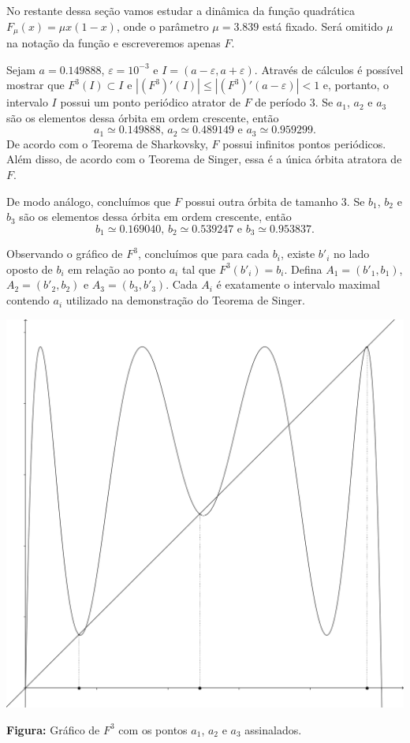 No restante dessa seção vamos estudar a dinâmica da função quadrática $F_\mu(x) = \mu x(1-x)$, onde o parâmetro $\mu = 3.839$ está fixado. Será omitido $\mu$ na notação da função e escreveremos apenas $F$.

Sejam $a = 0.149888$, $\varepsilon = 10^{-3}$ e $I = (a - \varepsilon, a + \varepsilon)$. Através de cálculos é possível mostrar que $F^3(I) \subset I$ e $|(F^3)'(I)| \leq |(F^3)'(a - \varepsilon)| < 1$ e, portanto, o intervalo $I$ possui um ponto periódico atrator de $F$ de período $3$. Se $a_1$, $a_2$ e $a_3$ são os elementos dessa órbita em ordem crescente, então
$$a_1 \simeq 0.149888 \textrm{, } a_2 \simeq 0.489149 \textrm{ e } a_3 \simeq 0.959299.$$
De acordo com o Teorema de Sharkovsky, $F$ possui infinitos pontos periódicos. Além disso, de acordo com o Teorema de Singer, essa é a única órbita atratora de $F$.

De modo análogo, concluímos que $F$ possui outra órbita de tamanho $3$. Se $b_1$, $b_2$ e $b_3$ são os elementos dessa órbita em ordem crescente, então
$$b_1 \simeq 0.169040 \textrm{, } b_2 \simeq 0.539247  \textrm{ e } b_3 \simeq 0.953837.$$

Observando o gráfico de $F^3$, concluímos que para cada $b_i$, existe $b'_i$ no lado oposto de $b_i$ em relação ao ponto $a_i$ tal que $F^3(b'_i) = b_i$. Defina $A_1 = (b'_1, b_1)$, $A_2 = (b'_2, b_2)$ e $A_3 = (b_3, b'_3)$. Cada $A_i$ é exatamente o intervalo maximal contendo $a_i$ utilizado na demonstração do Teorema de Singer.

\begin{center}
\includegraphics[scale=0.25]{images/f.png}

{\small \textbf{Figura:} Gráfico de $F^3$ com os pontos $a_1$, $a_2$ e $a_3$ assinalados.}
\end{center}

